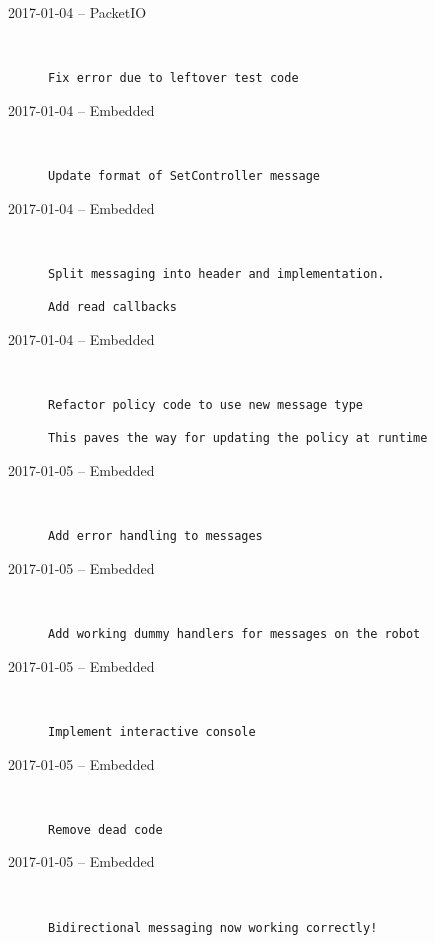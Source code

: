 \begin{description}
  \item[2017-01-04 -- PacketIO] \hfill \
\begin{lstlisting}
Fix error due to leftover test code
\end{lstlisting}


  \item[2017-01-04 -- Embedded] \hfill \
\begin{lstlisting}
Update format of SetController message
\end{lstlisting}


  \item[2017-01-04 -- Embedded] \hfill \
\begin{lstlisting}
Split messaging into header and implementation.

Add read callbacks
\end{lstlisting}


  \item[2017-01-04 -- Embedded] \hfill \
\begin{lstlisting}
Refactor policy code to use new message type

This paves the way for updating the policy at runtime
\end{lstlisting}


  \item[2017-01-05 -- Embedded] \hfill \
\begin{lstlisting}
Add error handling to messages
\end{lstlisting}


  \item[2017-01-05 -- Embedded] \hfill \
\begin{lstlisting}
Add working dummy handlers for messages on the robot
\end{lstlisting}


  \item[2017-01-05 -- Embedded] \hfill \
\begin{lstlisting}
Implement interactive console
\end{lstlisting}


  \item[2017-01-05 -- Embedded] \hfill \
\begin{lstlisting}
Remove dead code
\end{lstlisting}


  \item[2017-01-05 -- Embedded] \hfill \
\begin{lstlisting}
Bidirectional messaging now working correctly!
\end{lstlisting}



\end{description}
